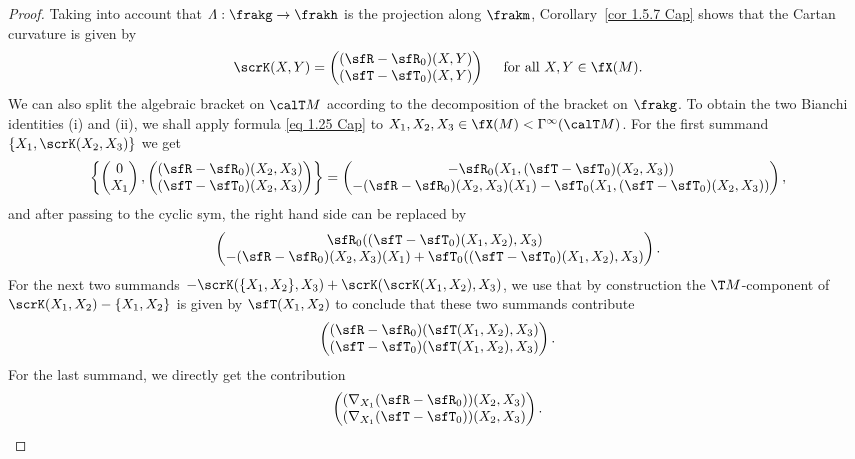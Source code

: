 \begin{proof}
    Taking into account that $\varLambda:\frakg\to \frakh$ is the projection along $\frakm$, Corollary~\ref{cor 1.5.7 Cap} shows that the Cartan curvature is given by 
    \[\scrK(X,Y)=\begin{pmatrix}
        (\sfR-\sfR_0)(X,Y)\\
        (\sfT-\sfT_0)(X,Y)
    \end{pmatrix}\quad\text{ for all }X,Y\in\fX(M).\]
    We can also split the algebraic bracket on $\calT M$ according to the decomposition of the bracket on $\frakg$. To obtain the two Bianchi identities (i) and (ii), we shall apply formula \eqref{eq 1.25 Cap} to $X_1,X_2,X_3\in\fX(M)<\Gamma^\infty(\calT M)$. For the first summand $\{X_1,\scrK(X_2,X_3)\}$ we get 
    \[\left\{\begin{pmatrix}
        0\\X_1
    \end{pmatrix},
    \begin{pmatrix}
        (\sfR-\sfR_0)(X_2,X_3)\\
        (\sfT-\sfT_0)(X_2,X_3)
    \end{pmatrix}
    \right\}=
    \begin{pmatrix}
        -\sfR_0(X_1,(\sfT-\sfT_0)(X_2,X_3))\\
        -(\sfR-\sfR_0)(X_2,X_3)(X_1)-\sfT_0(X_1,(\sfT-\sfT_0)(X_2,X_3))
    \end{pmatrix},
    \]
    and after passing to the cyclic sym, the right hand side can be replaced by 
    \[\begin{pmatrix}
        \sfR_0((\sfT-\sfT_0)(X_1,X_2),X_3)\\
        -(\sfR-\sfR_0)(X_2,X_3)(X_1)+\sfT_0((\sfT-\sfT_0)(X_1,X_2),X_3)
    \end{pmatrix}. \]
    For the next two summands $-\scrK(\{X_1,X_2\},X_3)+\scrK(\scrK(X_1,X_2),X_3)$, we use that by construction the $\T M$-component of $\scrK(X_1,X_2)-\{X_1,X_2\}$ is given by $\sfT(X_1,X_2)$ to conclude that these two summands contribute 
    \[\begin{pmatrix}
        (\sfR-\sfR_0)(\sfT(X_1,X_2),X_3)\\
        (\sfT-\sfT_0)(\sfT(X_1,X_2),X_3)
    \end{pmatrix}. \]
    For the last summand, we directly get the contribution 
    \[\begin{pmatrix}
        (\nabla_{X_1}(\sfR-\sfR_0))(X_2,X_3)\\
        (\nabla_{X_1}(\sfT-\sfT_0))(X_2,X_3)
    \end{pmatrix}.\]

\end{proof}
